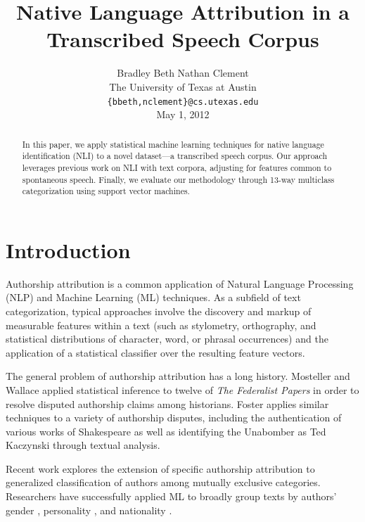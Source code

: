 \documentclass[11pt]{article}
\title{	Native Language Attribution in a Transcribed Speech Corpus}
\author{Bradley Beth \hspace{1em} Nathan Clement\\ 
The University of Texas at Austin \\
{\tt \{bbeth,nclement\}@cs.utexas.edu}\\May 1, 2012}
\begin{document}
\maketitle{}
\begin{abstract}
In this paper, we apply statistical machine learning techniques for native language identification (NLI) to a novel dataset---a transcribed speech corpus. Our approach leverages previous work on NLI with text corpora, adjusting for features common to spontaneous speech.  Finally, we evaluate our methodology through 13-way multiclass categorization using support vector machines.
\end{abstract}
\section{Introduction}
Authorship attribution is a common application of Natural Language Processing (NLP) and Machine Learning (ML) techniques. As a subfield of text categorization, typical approaches involve the discovery and markup of measurable features within a text (such as stylometry, orthography, and statistical distributions of character, word, or phrasal occurrences) and the application of a statistical classifier over the resulting feature vectors. 

The general problem of authorship attribution has a long history. Mosteller and Wallace  applied statistical inference to twelve of \emph{The Federalist Papers} in order to resolve disputed authorship claims among historians. Foster  applies similar techniques to a variety of authorship disputes, including the authentication of various works of Shakespeare as well as identifying the Unabomber as Ted Kaczynski through textual analysis.

Recent work explores the extension of specific authorship attribution to generalized classification of authors among mutually exclusive categories. Researchers have successfully applied ML to broadly group texts by authors' gender \cite{10.1109/CSAC.2002.1176299}, personality \cite{Nowson2007}, and nationality \cite{Argamon_Levitan_2004}.
\end{document}
